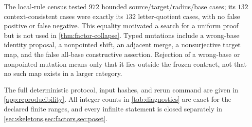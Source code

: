 

The local-rule census tested $972$ bounded source/target/radius/base cases;
its $132$ context-consistent cases were exactly its $132$ letter-quotient
cases, with no false positive or false negative.  This equality motivated a
search for a uniform proof but is not used in
\cref{thm:factor-collapse}.  Typed mutations include a wrong-base identity
proposal, a nonpointed shift, an adjacent merge, a nonsurjective target
map, and the false all-base constructive assertion.  Rejection of a
wrong-base or nonpointed mutation means only that it lies outside the frozen
contract, not that no such map exists in a larger category.

The full deterministic protocol, input hashes, and rerun command are given
in \cref{app:reproducibility}.  All integer counts in
\cref{tab:diagnostics} are exact for the declared finite ranges, and every
infinite statement is closed separately in \cref{sec:skeletons,sec:factors,sec:poset}.
